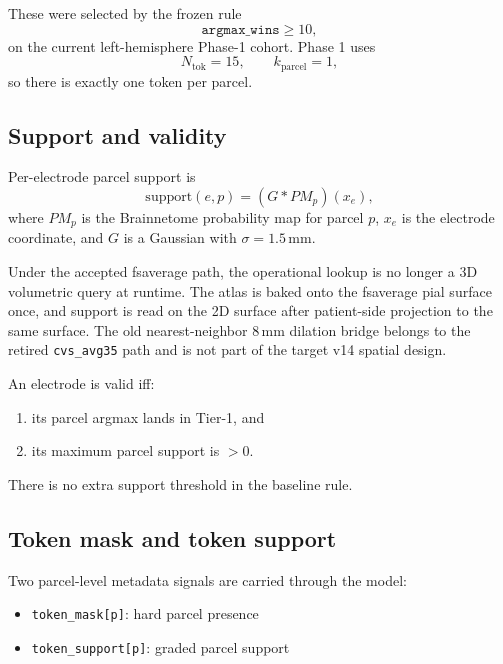 \documentclass[11pt,letterpaper]{article}
\begin{document}
These were selected by the frozen rule
\begin{equation}
\texttt{argmax\_wins} \ge 10,
\end{equation}
on the current left-hemisphere Phase-1 cohort. Phase 1 uses
\begin{equation}
N_{\text{tok}} = 15, \qquad k_{\text{parcel}} = 1,
\end{equation}
so there is exactly one token per parcel.

\subsection{Support and validity}

Per-electrode parcel support is
\begin{equation}
\text{support}(e,p) = (G * PM_p)(x_e),
\end{equation}
where $PM_p$ is the Brainnetome probability map for parcel $p$, $x_e$ is the electrode coordinate, and $G$ is a Gaussian with $\sigma = 1.5$\,mm.

Under the accepted fsaverage path, the operational lookup is no longer a 3D volumetric query at runtime. The atlas is baked onto the fsaverage pial surface once, and support is read on the 2D surface after patient-side projection to the same surface. The old nearest-neighbor 8\,mm dilation bridge belongs to the retired \texttt{cvs\_avg35} path and is not part of the target v14 spatial design.

An electrode is valid iff:
\begin{enumerate}[leftmargin=2em, itemsep=0.2em]
\item its parcel argmax lands in Tier-1, and
\item its maximum parcel support is \(> 0\).
\end{enumerate}

There is no extra support threshold in the baseline rule.

\subsection{Token mask and token support}

Two parcel-level metadata signals are carried through the model:
\begin{itemize}[leftmargin=2em, itemsep=0.2em]
\item \texttt{token\_mask[p]}: hard parcel presence
\item \texttt{token\_support[p]}: graded parcel support
\end{itemize}
\end{document}
